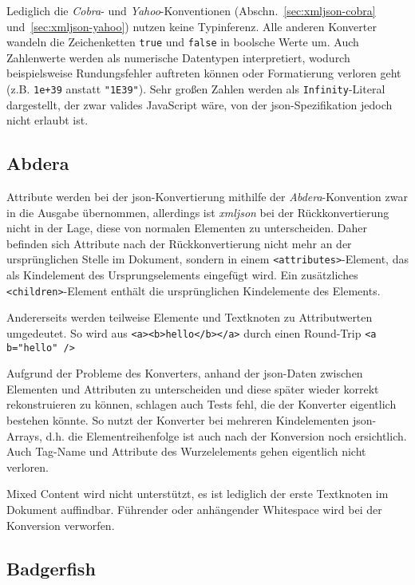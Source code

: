 Lediglich die \emph{Cobra}- und \emph{Yahoo}-Konventionen (Abschn.~\ref{sec:xmljson-cobra} und~\ref{sec:xmljson-yahoo}) nutzen keine Typinferenz. Alle anderen Konverter wandeln die Zeichenketten \texttt{true} und \texttt{false} in boolsche Werte um. Auch Zahlenwerte werden als numerische Datentypen interpretiert, wodurch beispielsweise Rundungsfehler auftreten können oder Formatierung verloren geht (z.B. \texttt{1e+39} anstatt \texttt{"1E39"}). Sehr großen Zahlen werden als \texttt{Infinity}-Literal dargestellt, der zwar valides JavaScript wäre, von der \acrshort{json}-Spezifikation jedoch nicht erlaubt ist.

\subsection{Abdera}
\label{sec:xmljson-abdera}

Attribute werden bei der \acrshort{json}-Konvertierung mithilfe der \emph{Abdera}-Konvention zwar in die Ausgabe übernommen, allerdings ist \emph{xmljson} bei der Rückkonvertierung nicht in der Lage, diese von normalen Elementen zu unterscheiden. Daher befinden sich Attribute nach der Rückkonvertierung nicht mehr an der ursprünglichen Stelle im Dokument, sondern in einem \texttt{<attributes>}-Element, das als Kindelement des Ursprungselements eingefügt wird. Ein zusätzliches \texttt{<children>}-Element enthält die ursprünglichen Kindelemente des Elements.

Andererseits werden teilweise Elemente und Textknoten zu Attributwerten umgedeutet. So wird aus \texttt{<a><b>hello</b></a>} durch einen Round-Trip \texttt{<a b="hello" />}

Aufgrund der Probleme des Konverters, anhand der \acrshort{json}-Daten zwischen Elementen und Attributen zu unterscheiden und diese später wieder korrekt rekonstruieren zu können, schlagen auch Tests fehl, die der Konverter eigentlich bestehen könnte. So nutzt der Konverter bei mehreren Kindelementen \acrshort{json}-Arrays, d.h. die Elementreihenfolge ist auch nach der Konversion noch ersichtlich.
Auch Tag-Name und Attribute des Wurzelelements gehen eigentlich nicht verloren.

Mixed Content wird nicht unterstützt, es ist lediglich der erste Textknoten im Dokument auffindbar.
Führender oder anhängender Whitespace wird bei der Konversion verworfen.

\subsection{Badgerfish}
\label{sec:xmljson-badgerfish}

